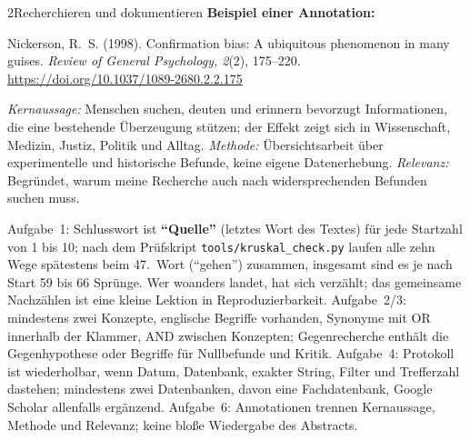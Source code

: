 \begin{uebungsblattb}{2}{Recherchieren und dokumentieren}
\smallskip
\noindent\textbf{Beispiel einer Annotation:}

\noindent\begin{minipage}{\textwidth}\small
Nickerson, R.~S. (1998). Confirmation bias: A ubiquitous phenomenon in many
guises. \emph{Review of General Psychology, 2}(2), 175--220.
\url{https://doi.org/10.1037/1089-2680.2.2.175}

\emph{Kernaussage:} Menschen suchen, deuten und erinnern bevorzugt
Informationen, die eine bestehende Überzeugung stützen; der Effekt zeigt sich
in Wissenschaft, Medizin, Justiz, Politik und Alltag. \emph{Methode:}
Übersichtsarbeit über experimentelle und historische Befunde, keine eigene
Datenerhebung. \emph{Relevanz:} Begründet, warum meine Recherche auch nach
widersprechenden Befunden suchen muss.
\end{minipage}

\begin{lehrhinweis}[Erwartungshorizont]
Aufgabe~1: Schlusswort ist \textbf{\enquote{Quelle}} (letztes Wort des
Textes) für jede Startzahl von 1 bis 10; nach dem Prüfskript
\texttt{tools/kruskal\_check.py} laufen alle zehn Wege spätestens beim 47.~Wort
(\enquote{gehen}) zusammen, insgesamt sind es je nach Start 59 bis 66 Sprünge.
Wer woanders landet, hat sich verzählt; das gemeinsame Nachzählen ist eine
kleine Lektion in Reproduzierbarkeit. Aufgabe~2/3: mindestens zwei Konzepte,
englische Begriffe vorhanden, Synonyme mit OR innerhalb der Klammer, AND
zwischen Konzepten; Gegenrecherche enthält die Gegenhypothese oder
Begriffe für Nullbefunde und Kritik. Aufgabe~4: Protokoll ist
wiederholbar, wenn Datum, Datenbank, exakter String, Filter und Trefferzahl
dastehen; mindestens zwei Datenbanken, davon eine Fachdatenbank, Google
Scholar allenfalls ergänzend. Aufgabe~6: Annotationen trennen Kernaussage,
Methode und Relevanz; keine bloße Wiedergabe des Abstracts.
\end{lehrhinweis}
\end{uebungsblattb}
